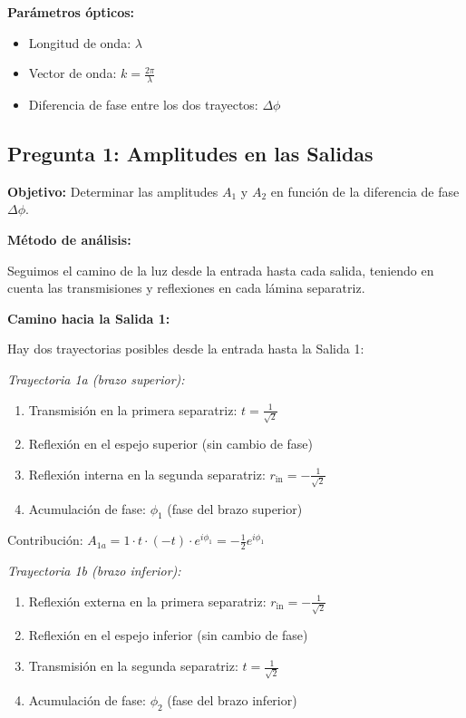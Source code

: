 \documentclass[12pt,a4paper]{article}
\begin{document}
\textbf{Parámetros ópticos:}
\begin{itemize}
    \item Longitud de onda: $\lambda$
    \item Vector de onda: $k = \frac{2\pi}{\lambda}$
    \item Diferencia de fase entre los dos trayectos: $\Delta\phi$
\end{itemize}

\subsection{Pregunta 1: Amplitudes en las Salidas}

\textbf{Objetivo:} Determinar las amplitudes $A_1$ y $A_2$ en función de la diferencia de fase $\Delta\phi$.

\textbf{Método de análisis:}

Seguimos el camino de la luz desde la entrada hasta cada salida, teniendo en cuenta las transmisiones y reflexiones en cada lámina separatriz.

\textbf{Camino hacia la Salida 1:}

Hay dos trayectorias posibles desde la entrada hasta la Salida 1:

\textit{Trayectoria 1a (brazo superior):}
\begin{enumerate}
    \item Transmisión en la primera separatriz: $t = \frac{1}{\sqrt{2}}$
    \item Reflexión en el espejo superior (sin cambio de fase)
    \item Reflexión interna en la segunda separatriz: $r_{\text{in}} = -\frac{1}{\sqrt{2}}$
    \item Acumulación de fase: $\phi_1$ (fase del brazo superior)
\end{enumerate}

Contribución: $A_{1a} = 1 \cdot t \cdot (-t) \cdot e^{i\phi_1} = -\frac{1}{2} e^{i\phi_1}$

\textit{Trayectoria 1b (brazo inferior):}
\begin{enumerate}
    \item Reflexión externa en la primera separatriz: $r_{\text{in}} = -\frac{1}{\sqrt{2}}$
    \item Reflexión en el espejo inferior (sin cambio de fase)
    \item Transmisión en la segunda separatriz: $t = \frac{1}{\sqrt{2}}$
    \item Acumulación de fase: $\phi_2$ (fase del brazo inferior)
\end{enumerate}
\end{document}
